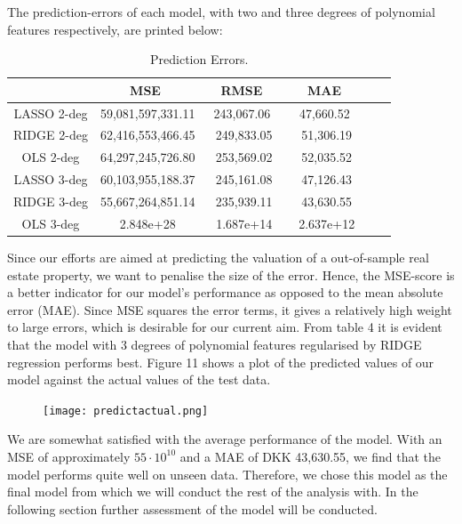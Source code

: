 \documentclass[12pt,a4paper]{article}
\begin{document}
The prediction-errors of each model, with two and three degrees of polynomial features respectively, are printed below:
\begin{table}[H]
\begin{center}
\caption{Prediction Errors. \label{time}}
\begin{tabular}{| c | c | c | c | c | c |} 
\hline
   & \ MSE \ & \, RMSE \ & \ MAE \ \\ \hline
   LASSO 2-deg & 59,081,597,331.11 & \ 243,067.06 \  & \ 47,660.52 \ \\ 
  RIDGE 2-deg & 62,416,553,466.45 & 249,833.05 & 51,306.19  \\ 
  OLS 2-deg & 64,297,245,726.80 & 253,569.02 & 52,035.52  \\ \hline 
  LASSO 3-deg & 60,103,955,188.37 & 245,161.08 & 47,126.43  \\ 
  RIDGE 3-deg & 55,667,264,851.14 & 235,939.11 & 43,630.55  \\ 
  OLS 3-deg & 2.848e+28 & 1.687e+14 & 2.637e+12  \\ \hline
\end{tabular}
\end{center}
\end{table}
Since our efforts are aimed at predicting the valuation of a out-of-sample real estate property, we want to penalise the size of the error. Hence, the MSE-score is a better indicator for our model's performance as opposed to the mean absolute error (MAE). Since MSE squares the error terms, it gives a relatively high weight to large errors, which is desirable for our current aim. \newline
From table 4 it is evident that the model with 3 degrees of polynomial features regularised by RIDGE regression performs best. Figure 11 shows a plot of the predicted values of our model against the actual values of the test data. 

\begin{figure}[H]
\centering
\caption{}
\texttt{[image: predictactual.png]}
\end{figure}
We are somewhat satisfied with the average performance of the model. With an MSE of approximately $55\cdot10^{10}$ and a MAE of DKK 43,630.55, we find that the model performs quite well on unseen data. Therefore, we chose this model as the final model from which we will conduct the rest of the analysis with. In the following section further assessment of the model will be conducted.
\end{document}
